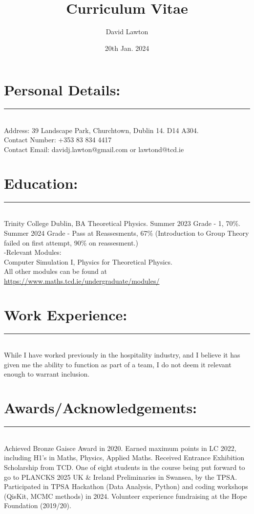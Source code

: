 \documentclass{article}
\title{Curriculum Vitae}
\author{David Lawton}
\date{20th Jan. 2024}
\begin{document}
\maketitle
\vfill

\section*{Personal Details:}
\hrule~\\
Address: 39 Landscape Park, Churchtown, Dublin 14. D14 A304.\\
Contact Number: +353 83 834 4417\\
Contact Email: davidj.lawton@gmail.com or lawtond@tcd.ie\\

\section*{Education:}
\hrule~\\
Trinity College Dublin, BA Theoretical Physics. Summer 2023 Grade - 1, 70\%. Summer 2024 Grade - Pass at Reassesments, 67\% (Introduction to Group Theory failed on first attempt, 90\% on reassesment.)\\
-Relevant Modules:\\
\indent Computer Simulation I, Physics for Theoretical Physics.\\
All other modules can be found at \url{https://www.maths.tcd.ie/undergraduate/modules/}

\section*{Work Experience:}
\hrule~\\
While I have worked previously in the hospitality industry, and I believe it has given me the ability to function as part of a team, I do not deem it relevant enough to warrant inclusion. 
\section*{Awards/Acknowledgements:}
\hrule~\\
Achieved Bronze Gaisce Award in 2020.  Earned maximum points in LC 2022, including H1's in Maths, Physics, Applied Maths.  Received Entrance Exhibition Scholarship from TCD.  One of eight students in the course being put forward to go to PLANCKS 2025 UK \& Ireland Preliminaries in Swansea, by the TPSA.  Participated in TPSA Hackathon (Data Analysis, Python) and coding workshops (QisKit, MCMC methods) in 2024. Volunteer experience fundraising at the Hope Foundation (2019/20).
\end{document}
